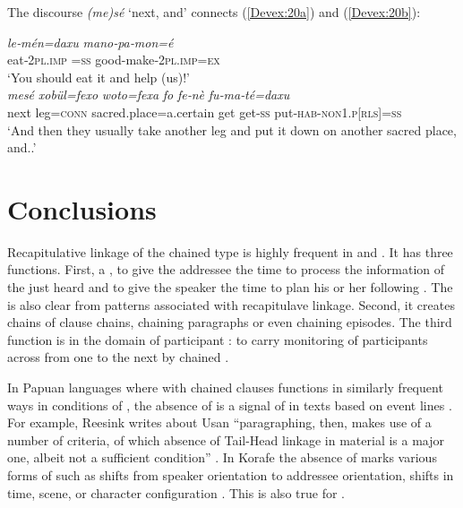 \documentclass[output=paper]{LSP/langsci}
\begin{document}
The discourse  \textit{(me)sé} `next, and' connects (\ref{Devex:20a}) and (\ref{Devex:20b}):

\begin{exe}
\ex \label{Devex:20ab}
\begin{xlist}
\ex \label{Devex:20a}			     
\gll \textit{le‑mén=daxu} \textit{mano‑pa‑mon=é}\\
eat‑\textsc{2pl.imp =ss}	good-make‑\textsc{2pl.imp=ex}\\
\glt `You should  eat it and help (us)!'\\
	
\ex \label{Devex:20b}			     
\gll \textit{mesé} \textit{xobül=fexo} \textit{woto=fexa} \textit{fo} \textit{fe‑nè} \textit{fu‑ma‑té=daxu}\\
next leg=\textsc{conn} sacred.place=a.certain get get‑\textsc{ss} put‑\textsc{hab-non1.p[rls]=ss}\\
\glt `And then they usually take another leg and put it down on another sacred place, and..'\\
\end{xlist}
\end{exe}

\section{Conclusions} 
\label{DevConclusions}
Recapitulative linkage of the chained type is highly frequent in   and . It has three functions. First, a , to give the addressee the time to process the information of  the  just heard and to give the speaker the time to plan his or her following . The  is also clear from  patterns associated with recapitulave linkage.  Second, it creates chains of clause chains, chaining paragraphs or even chaining episodes.  The third function  is in the domain of participant : to carry   monitoring of participants across from one  to the next by chained .  

In Papuan languages where  with chained clauses functions in similarly frequent ways in conditions of , the absence of  is a signal of  in texts based on  event lines \citep[][375]{devries.2005}.  For example, Reesink writes about Usan ``paragraphing, then, makes use of a number of criteria, of which absence of Tail-Head linkage in  material is a major one, albeit not a sufficient condition'' \citep[][332]{reesink87}. In Korafe the absence of  marks various forms of  such as shifts from speaker orientation to addressee orientation, shifts in time, scene, or character configuration \citep[][337, 363]{farr99}. This is also true for . 
\end{document}
